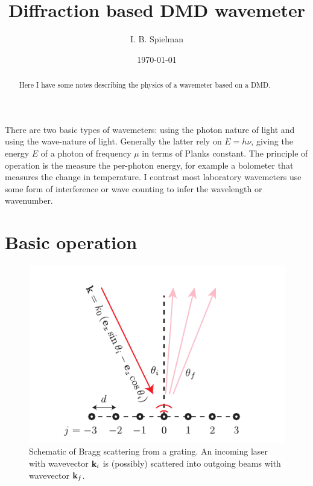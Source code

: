 \documentclass[letterpaper,preprint,aps,pra,superscriptaddress]{revtex4-1}
\begin{document}
\title{Diffraction based DMD wavemeter}

\author{I. B. Spielman}

\date{\today}
\begin{abstract}
Here I have some notes describing the physics of a wavemeter based on a DMD.
\end{abstract}
\maketitle

There are two basic types of wavemeters:  using the photon nature of light and using the wave-nature of light.  Generally the latter rely on $E=h\nu$, giving the energy $E$ of a photon of frequency $\mu$ in terms of Planks constant.  The principle of operation is the measure the per-photon energy, for example a bolometer that measures the change in temperature.  I contrast most laboratory wavemeters use some form of interference or wave counting to infer the wavelength or wavenumber. 

\section{Basic operation}

\begin{figure}
\includegraphics{Schematic}
\caption{Schematic of Bragg scattering from a grating.  An incoming laser with wavevector ${\bf k}_i$ is (possibly) scattered into outgoing beams with wavevector ${\bf k}_f$.}
\label{fig:Grating_Schematic}
\end{figure}
\end{document}
